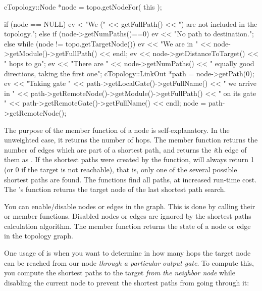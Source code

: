 \begin{cpp}
cTopology::Node *node = topo.getNodeFor( this );

if (node == NULL)
{
  ev < "We (" << getFullPath() << ") are not included in the topology.\n";
}
else if (node->getNumPaths()==0)
{
  ev << "No path to destination.\n";
}
else
{
  while (node != topo.getTargetNode())
  {
    ev << "We are in " << node->getModule()->getFullPath() << endl;
    ev << node->getDistanceToTarget() << " hops to go\n";
    ev << "There are " << node->getNumPaths()
       << " equally good directions, taking the first one\n";
    cTopology::LinkOut *path = node->getPath(0);
    ev << "Taking gate " << path->getLocalGate()->getFullName()
       << " we arrive in " << path->getRemoteNode()->getModule()->getFullPath()
       << " on its gate " << path->getRemoteGate()->getFullName() << endl;
    node = path->getRemoteNode();
  }
}
\end{cpp}


The purpose of the  member function of a
node is self-explanatory. In the unweighted case, it returns the
number of hops. The  member function returns the number
of edges which are part of a shortest path, and
 returns the \textit{i}th edge of them as
. If the shortest paths were created by the
 function,
 will always return 1 (or 0 if the target is not
reachable), that is, only one of the several possible shortest paths
are found.  The
 functions
find all paths, at increased run-time cost. The 's
 function returns the target node of the last
shortest path search.

You can enable/disable nodes or edges in the graph. This is done by
calling their  or  member functions.
Disabled nodes or edges are ignored by the shortest paths calculation
algorithm. The  member function returns the state of
a node or edge in the topology graph.

One usage of  is when you want to determine in how many
hops the target node can be reached from our node \textit{through
a particular output gate}. To compute this, you compute the
shortest paths to the target \textit{from the neighbor node} while
disabling the current node to prevent the shortest paths
from going through it:

